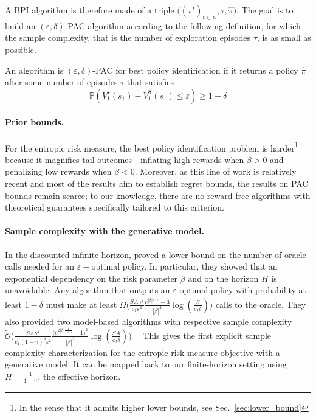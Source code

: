 \documentclass[final,12pt]{colt2026} %
\begin{document}
A BPI algorithm is therefore made of a triple $\big((\pi^{t})_{t\in\mathbb{N}},\tau,\hat{\pi}\big)$. 
The goal is to build an $(\varepsilon,\delta)$-PAC algorithm according to the following definition, for which the sample complexity, that is the number of exploration episodes $\tau$, is as small as possible.

\begin{definition}\label{BPI}
An algorithm is $(\varepsilon,\delta)$-PAC for best policy identification if it returns a policy $\hat{\pi}$ after some number of episodes $\tau$ that satisfies
$$
\mathbb{P} \left( V^{\star}_{1}(s_{1})-V^{\hat{\pi}}_{1}(s_{1}) \leq \varepsilon \right) \ge 1-\delta 
$$
\end{definition}
\paragraph{Prior bounds. }
For the entropic risk measure, the best policy identification problem is harder\footnote{In the sense that it admits higher lower bounds, see Sec.~\ref{sec:lower_bound}} because it magnifies tail outcomes—inflating high rewards when $\beta>0$ and penalizing low rewards when $\beta<0$. Moreover, as this line of work is relatively recent and most of the results aim to establish regret bounds, the results on PAC bounds remain scarce; to our knowledge, there are no reward-free algorithms \citep{Jin2020RewardFree,Kaufmann2021ALT} with theoretical guarantees specifically tailored to this criterion.\\

\paragraph{Sample complexity with the generative model. } In the discounted infinite-horizon, \citet{MortensenTalebi2025} proved a lower bound on the number of oracle calls needed for an $\varepsilon-$optimal policy. In particular, they showed that an exponential dependency on the risk parameter $\beta$ and on the horizon $H$ is unavoidable: Any algorithm that outputs an $\varepsilon$-optimal policy with probability at least $1-\delta$ must make at least $ \Omega\Bigg(\frac{SA\gamma^{2}}{c_{1}\varepsilon^{2}} \frac{e^{|\beta|^{\frac{1}{1-\gamma}}}-3}{|\beta|^{2}} \log\left(\frac{S}{c_{2}\delta}\right)\Bigg) $ calls to the oracle. They also provided two model-based algorithms with respective sample complexity $\tilde{\mathcal{O}}\Bigg(\frac{SA\gamma^{2}}{c_{1}(1-\gamma)^4\varepsilon^{2}} \frac{\Big(e^{2|\beta|{\frac{1}{1-\gamma}}}-1\Big)^2}{|\beta|^{2}} \log\left(\frac{SA}{c_{2}\delta}\right)\Bigg) \quad$ 
This gives the first explicit sample complexity characterization for the entropic risk measure objective with a generative model. It can be mapped back to our finite-horizon setting using $H = \frac{1}{1-\gamma}$, the effective horizon.
\end{document}
